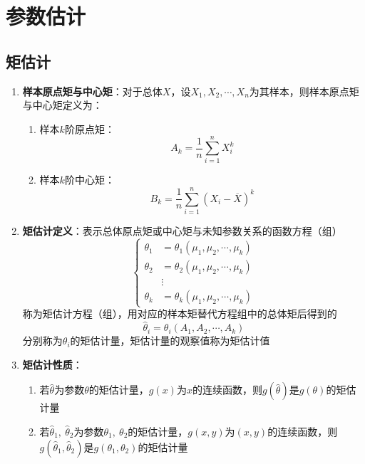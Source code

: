 \documentclass[12pt,a4paper,UTF8]{book}
\begin{document}
\section{参数估计}
\subsection{矩估计}
\begin{enumerate}
\item \textbf{样本原点矩与中心矩}：对于总体$X$，设$X_1,X_2,\cdots,X_n$为其样本，则样本原点矩与中心矩定义为：
\begin{enumerate}
\item 样本$k$阶原点矩：
\[A_k=\frac{1}{n}\sum\limits_{i=1}^{n}X_i^k\]
\item 样本$k$阶中心矩：
\[B_k=\frac{1}{n}\sum\limits_{i=1}^{n}\left(X_i-\overline{X}\right)^k\]
\end{enumerate}
\item \textbf{矩估计定义}：表示总体原点矩或中心矩与未知参数关系的函数方程（组）
\[\left\{\begin{aligned}
\theta_1&=\theta_1\left(\mu_1,\mu_2,\cdots,\mu_k\right)\\
\theta_2&=\theta_2\left(\mu_1,\mu_2,\cdots,\mu_k\right)\\
&\vdots\\
\theta_k&=\theta_k\left(\mu_1,\mu_2,\cdots,\mu_k\right)
\end{aligned}\right.\]
称为矩估计方程（组），用对应的样本矩替代方程组中的总体矩后得到的
\[\hat{\theta}_i=\theta_i\left(A_1,A_2,\cdots,A_k\right)\]
分别称为$\theta_i$的矩估计量，矩估计量的观察值称为矩估计值
\item \textbf{矩估计性质}：
\begin{enumerate}
\item 若$\hat{\theta}$为参数$\theta$的矩估计量，$g\left(x\right)$为$x$的连续函数，则$g\left(\hat{\theta}\right)$是$g\left(\theta\right)$的矩估计量
\item 若$\hat{\theta}_1,\ \hat{\theta}_2$为参数$\theta_1,\ \theta_2$的矩估计量，$g\left(x,y\right)$为$\left(x,y\right)$的连续函数，则$g\left(\hat{\theta}_1,\hat{\theta}_2\right)$是$g\left(\theta_1,\theta_2\right)$的矩估计量
\end{enumerate}
\end{enumerate}
\end{document}
